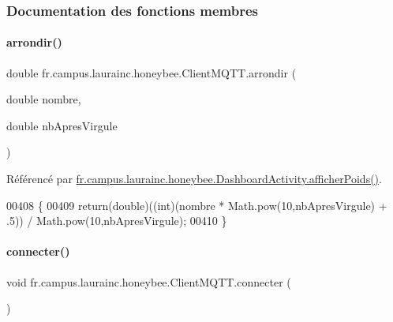\subsubsection{Documentation des fonctions membres}
\mbox{\label{classfr_1_1campus_1_1laurainc_1_1honeybee_1_1_client_m_q_t_t_a00ce9a2b07615c9337e452b5a51fedbe}} 
\paragraph{\texorpdfstring{arrondir()}{arrondir()}}
{\footnotesize\ttfamily double fr.\+campus.\+laurainc.\+honeybee.\+Client\+M\+Q\+T\+T.\+arrondir (\begin{DoxyParamCaption}\item[{double}]{nombre,  }\item[{double}]{nb\+Apres\+Virgule }\end{DoxyParamCaption})}



Référencé par \hyperlink{classfr_1_1campus_1_1laurainc_1_1honeybee_1_1_dashboard_activity_a13786896440cb102e03bd5ac4f54c3d8}{fr.\+campus.\+laurainc.\+honeybee.\+Dashboard\+Activity.\+afficher\+Poids()}.


\begin{DoxyCode}
00408     \{
00409         \textcolor{keywordflow}{return}(\textcolor{keywordtype}{double})((int)(nombre * Math.pow(10,nbApresVirgule) + .5)) / Math.pow(10,nbApresVirgule);
00410     \}
\end{DoxyCode}
\mbox{\label{classfr_1_1campus_1_1laurainc_1_1honeybee_1_1_client_m_q_t_t_ab514adf6ebb879734ee8f2b3b2fd106a}} 
\paragraph{\texorpdfstring{connecter()}{connecter()}}
{\footnotesize\ttfamily void fr.\+campus.\+laurainc.\+honeybee.\+Client\+M\+Q\+T\+T.\+connecter (\begin{DoxyParamCaption}{ }\end{DoxyParamCaption})\hspace{0.3cm}{\ttfamily [private]}}



